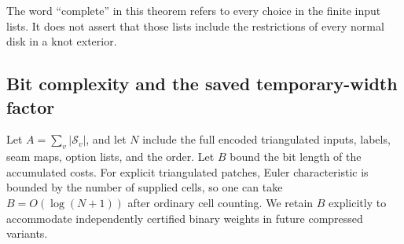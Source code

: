 \documentclass[11pt,letterpaper]{article}
\theoremstyle{definition}
\begin{document}
The word ``complete'' in this theorem refers to every choice in the finite input lists. It does not assert that those lists include the restrictions of every normal disk in a knot exterior.

\subsection{Bit complexity and the saved temporary-width factor}
Let $A=\sum_v|\mathcal S_v|$, and let $N$ include the full encoded triangulated inputs, labels, seam maps, option lists, and the order. Let $B$ bound the bit length of the accumulated costs. For explicit triangulated patches, Euler characteristic is bounded by the number of supplied cells, so one can take $B=O(\log(N+1))$ after ordinary cell counting. We retain $B$ explicitly to accommodate independently certified binary weights in future compressed variants.
\end{document}
